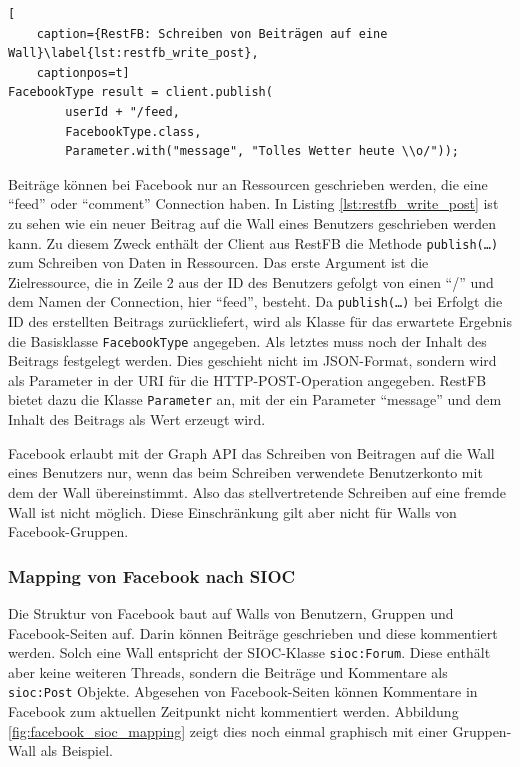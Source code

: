 \begin{lstlisting}[
    caption={RestFB: Schreiben von Beiträgen auf eine Wall}\label{lst:restfb_write_post},
    captionpos=t]
FacebookType result = client.publish(
        userId + "/feed,
        FacebookType.class,
        Parameter.with("message", "Tolles Wetter heute \\o/"));
\end{lstlisting}

Beiträge können bei Facebook nur an Ressourcen geschrieben werden, die eine \enquote{feed} oder \enquote{comment} Connection haben. In Listing \ref{lst:restfb_write_post} ist zu sehen wie ein neuer Beitrag auf die Wall eines Benutzers geschrieben werden kann. Zu diesem Zweck enthält der Client aus RestFB die Methode \texttt{publish(\dots)} zum Schreiben von Daten in Ressourcen. Das erste Argument ist die Zielressource, die in Zeile 2 aus der ID des Benutzers gefolgt von einen \enquote{/} und dem Namen der Connection, hier \enquote{feed}, besteht. Da \texttt{publish(\dots)} bei Erfolgt die ID des erstellten Beitrags zurückliefert, wird als Klasse für das erwartete Ergebnis die Basisklasse \texttt{FacebookType} angegeben. Als letztes muss noch der Inhalt des Beitrags festgelegt werden. Dies geschieht nicht im JSON-Format, sondern wird als Parameter in der URI für die HTTP-POST-Operation angegeben. RestFB bietet dazu die Klasse \texttt{Parameter} an, mit der ein Parameter \enquote{message} und dem Inhalt des Beitrags als Wert erzeugt wird.

Facebook erlaubt mit der Graph API das Schreiben von Beitragen auf die Wall eines Benutzers nur, wenn das beim Schreiben verwendete Benutzerkonto mit dem der Wall übereinstimmt. Also das stellvertretende Schreiben auf eine fremde Wall ist nicht möglich. Diese Einschränkung gilt aber nicht für Walls von Facebook-Gruppen.


\subsubsection{Mapping von Facebook nach SIOC} %
\label{ssub:facebook_mapping_nach_sioc}

Die Struktur von Facebook baut auf Walls von Benutzern, Gruppen und Facebook-Seiten auf. Darin können Beiträge geschrieben und diese kommentiert werden. Solch eine Wall entspricht der SIOC-Klasse \texttt{sioc:Forum}. Diese enthält aber keine weiteren Threads, sondern die Beiträge und Kommentare als \texttt{sioc:Post} Objekte. Abgesehen von Facebook-Seiten können Kommentare in Facebook zum aktuellen Zeitpunkt nicht kommentiert werden. Abbildung \ref{fig:facebook_sioc_mapping} zeigt dies noch einmal graphisch mit einer Gruppen-Wall als Beispiel.


